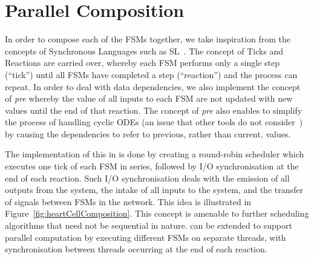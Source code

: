 
\section{Parallel Composition}
\label{sec:composition}

%  

In order to compose each of the \acp{FSM} together, we take inspiration
from the concepts of Synchronous Languages such as SL~\cite{SlLanguage}.
The concept of Ticks and Reactions are carried over, whereby each
\ac{FSM} performs only a single step (``tick'') until all \acp{FSM} have
completed a step (``reaction'') and the process can repeat.  In order to
deal with data dependencies, we also implement the concept of \emph{pre}
whereby the value of all inputs to each \ac{FSM} are not updated with
new values until the end of that reaction.  The concept of \emph{pre}
also enables \ourTool to simplify the process of handling cyclic
\acp{ODE} (an issue that other tools do not
consider~\cite{kim2003modular}) by causing the dependencies to refer to
previous, rather than current, values.

The implementation of this in \ourTool is done by creating a round-robin
scheduler which executes one tick of each \ac{FSM} in series, followed
by I/O synchronisation at the end of each reaction.  Such I/O
synchronisation deals with the emission of all outputs from the system,
the intake of all inputs to the system, and the transfer of signals
between \acp{FSM} in the network.  This idea is illustrated in
Figure~\ref{fig:heartCellComposition}.  This concept is amenable to
further scheduling algorithms that need not be sequential in nature.
\ourTool can be extended to support parallel computation by executing
different \acp{FSM} on separate threads, with synchronisation between
threads occurring at the end of each reaction.